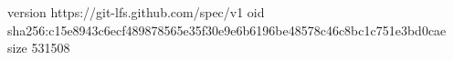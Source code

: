 version https://git-lfs.github.com/spec/v1
oid sha256:c15e8943c6ecf489878565e35f30e9e6b6196be48578c46c8bc1c751e3bd0cae
size 531508
